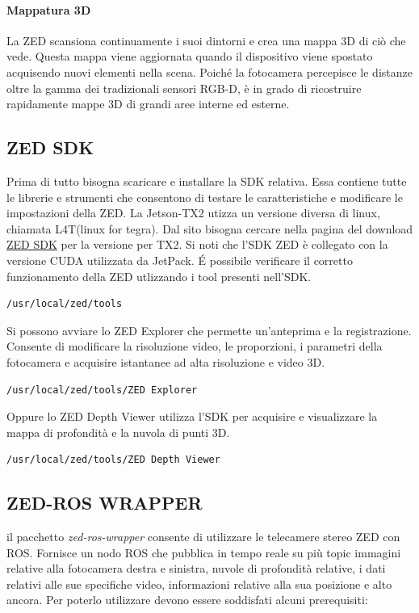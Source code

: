\documentclass[a4paper]{article}
\begin{document}
\paragraph{Mappatura 3D}
La ZED scansiona continuamente i suoi dintorni e crea una mappa 3D di ciò che vede. Questa mappa viene aggiornata quando il dispositivo viene spostato acquisendo nuovi elementi nella scena. Poiché la fotocamera percepisce le distanze oltre la gamma dei tradizionali sensori RGB-D, è in grado di ricostruire rapidamente mappe 3D di grandi aree interne ed esterne.

\subsection{ZED SDK}
Prima di tutto bisogna scaricare e installare la SDK relativa. Essa contiene tutte le librerie e strumenti che  consentono di testare le caratteristiche e modificare le impostazioni della ZED.
La Jetson-TX2 utizza un versione diversa di linux, chiamata L4T(linux for tegra). Dal sito bisogna cercare nella pagina del download 
 \href{https://www.stereolabs.com/developers/release/#sdkdownloads_anchor}{ZED SDK} per la versione per TX2. 
Si noti che l'SDK ZED è collegato con la versione CUDA utilizzata da JetPack.
\'E possibile verificare il corretto funzionamento della ZED utlizzando i tool presenti nell'SDK.
\begin{verbatim}
/usr/local/zed/tools
\end{verbatim}
Si possono avviare lo ZED Explorer che permette un'anteprima e la registrazione. Consente di modificare la risoluzione video, le proporzioni, i parametri della fotocamera e acquisire istantanee ad alta risoluzione e video 3D.
\begin{verbatim}
/usr/local/zed/tools/ZED Explorer
\end{verbatim}
Oppure lo ZED Depth Viewer utilizza l'SDK per acquisire e visualizzare la mappa di profondità e la nuvola di punti 3D.
\begin{verbatim}
/usr/local/zed/tools/ZED Depth Viewer
\end{verbatim}
\newpage
\subsection{ZED-ROS WRAPPER}

il pacchetto \textit{zed-ros-wrapper} consente di utilizzare le telecamere stereo ZED con ROS. 
Fornisce un nodo ROS che pubblica in tempo reale su più topic immagini relative alla fotocamera destra e sinistra, nuvole di profondità relative, i dati relativi alle sue specifiche video, informazioni relative alla sua posizione e alto ancora.
Per poterlo utilizzare devono essere soddisfati alcuni prerequisiti:
\end{document}
